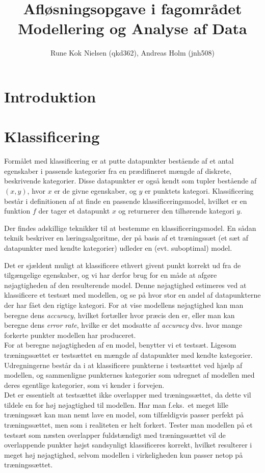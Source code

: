 \documentclass{article}
\author{Rune Kok Nielsen (qkd362), Andreas Holm (jnh508)}
\title{Afløsningsopgave i fagområdet Modellering og Analyse af Data}
\begin{document}
\maketitle

\newpage
\tableofcontents
\newpage

\section{Introduktion}

\section{Klassificering}
Formålet med klassificering er at putte datapunkter bestående af et antal egenskaber i passende kategorier fra en prædifineret mængde af diskrete, beskrivende kategorier. Disse datapunkter er også kendt som tupler bestående af $(x,y)$, hvor $x$ er de givne egenskaber, og $y$ er punktets kategori. Klassificering består i definitionen af at finde en passende klassificeringsmodel, hvilket er en funktion $f$ der tager et datapunkt $x$ og returnerer den tilhørende kategori $y$.

Der findes adskillige teknikker til at bestemme en klassificeringsmodel. En sådan teknik beskriver en læringsalgoritme, der på basis af et træningssæt (et sæt af datapunkter med kendte kategorier) udleder en (evt. suboptimal) model.

Det er sjældent muligt at klassificere ethvert givent punkt korrekt ud fra de tilgængelige egenskaber, og vi har derfor brug for en måde at afgøre nøjagtigheden af den resulterende model. Denne nøjagtighed estimeres ved at klassificere et testsæt med modellen, og se på hvor stor en andel af datapunkterne der har fået den rigtige kategori. For at vise modellens nøjagtighed kan man beregne dens \textit{accuracy}, hvilket fortæller hvor præcis den er, eller man kan beregne dens \textit{error rate}, hvilke er det modsatte af \textit{accuracy} dvs. hvor mange forkerte punkter modellen har produceret.\\
For at beregne nøjagtigheden af en model, benytter vi et testsæt. Ligesom træningssættet er testsættet en mængde af datapunkter med kendte kategorier. Udregningerne består da i at klassificere punkterne i testsættet ved hjælp af modellen, og sammenligne punkternes kategorier som udregnet af modellen med deres egentlige kategorier, som vi kender i forvejen.\\
Det er essentielt at testsættet ikke overlapper med træningssættet, da dette vil tildele en for høj nøjagtighed til modellen. Har man f.eks.\ et meget lille træningssæt kan man nemt lave en model, som tilfældigvis passer perfekt på træningssættet, men som i realiteten er helt forkert. Tester man modellen på et testsæt som næsten overlapper fuldstændigt med træningssættet vil de overlappende punkter højst sandsynligt klassificeres korrekt, hvilket resulterer i meget høj nøjagtighed, selvom modellen i virkeligheden kun passer netop på træningssættet. 
\end{document}
